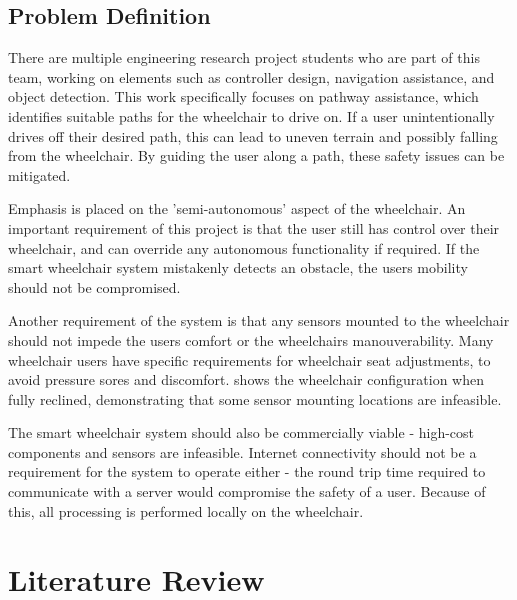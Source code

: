 \documentclass[12pt]{article}
\begin{document}
\pagebreak
\subsection{Problem Definition}
There are multiple engineering research project students who are part of this team,
working on elements such as controller design, navigation assistance, and object detection.
This work specifically focuses on pathway assistance, which identifies suitable
paths for the wheelchair to drive on. If a user unintentionally drives off their desired path,
this can lead to uneven terrain and possibly falling from the wheelchair.
By guiding the user along a path, these safety issues can be mitigated.

Emphasis is placed on the 'semi-autonomous' aspect of the wheelchair.
An important requirement of this project is that the user still
has control over their wheelchair, and can override any autonomous functionality
if required. If the smart wheelchair system mistakenly detects an obstacle,
the users mobility should not be compromised.

Another requirement of the system is that any sensors mounted to the wheelchair
should not impede the users comfort or the wheelchairs manouverability.
Many wheelchair users have specific requirements for wheelchair seat adjustments,
to avoid pressure sores and discomfort.  shows the
wheelchair configuration when fully reclined, demonstrating that some sensor mounting locations
are infeasible.

The smart wheelchair system should also be commercially viable - high-cost
components and sensors are infeasible. Internet connectivity should not be a requirement
for the system to operate either - the round trip time required to communicate with a server
would compromise the safety of a user. Because of this, all processing is performed locally
on the wheelchair.

\pagebreak





\section{Literature Review}
\end{document}
